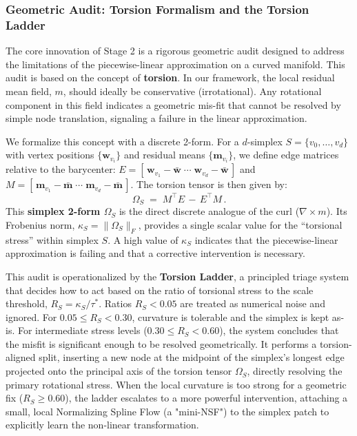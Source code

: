 \documentclass[11pt]{article}
\begin{document}
\subsubsection{Geometric Audit: Torsion Formalism and the Torsion Ladder}
The core innovation of Stage 2 is a rigorous geometric audit designed to address the limitations of the piecewise-linear approximation on a curved manifold. This audit is based on the concept of \textbf{torsion}. In our framework, the local residual mean field, $m$, should ideally be conservative (irrotational). Any rotational component in this field indicates a geometric mis-fit that cannot be resolved by simple node translation, signaling a failure in the linear approximation.

We formalize this concept with a discrete 2-form. For a $d$-simplex $S=\{v_0,\dots,v_d\}$ with vertex positions $\{\mathbf w_{v_i}\}$ and residual means $\{\mathbf m_{v_i}\}$, we define edge matrices relative to the barycenter: $E=[\,\mathbf w_{v_1}{-}\bar{\mathbf w}\;\cdots\;\mathbf w_{v_d}{-}\bar{\mathbf w}\,]$ and $M=[\,\mathbf m_{v_1}{-}\bar{\mathbf m}\;\cdots\;\mathbf m_{v_d}{-}\bar{\mathbf m}\,]$. The torsion tensor is then given by:
\[
\Omega_S \;=\; M^{\top}E \,{-}\, E^{\top}M\,.
\]
This \textbf{simplex 2-form $\Omega_S$} is the direct discrete analogue of the curl ($\nabla \times m$). Its Frobenius norm, $\kappa_S = \lVert \Omega_S \rVert_F$, provides a single scalar value for the ``torsional stress'' within simplex $S$. A high value of $\kappa_S$ indicates that the piecewise-linear approximation is failing and that a corrective intervention is necessary.

This audit is operationalized by the \textbf{Torsion Ladder}, a principled triage system that decides how to act based on the ratio of torsional stress to the scale threshold, $R_S = \kappa_S / \tau^*$. Ratios $R_S < 0.05$ are treated as numerical noise and ignored. For $0.05 \le R_S < 0.30$, curvature is tolerable and the simplex is kept as-is. For intermediate stress levels ($0.30 \le R_S < 0.60$), the system concludes that the misfit is significant enough to be resolved geometrically. It performs a torsion-aligned split, inserting a new node at the midpoint of the simplex's longest edge projected onto the principal axis of the torsion tensor $\Omega_S$, directly resolving the primary rotational stress. When the local curvature is too strong for a geometric fix ($R_S \ge 0.60$), the ladder escalates to a more powerful intervention, attaching a small, local Normalizing Spline Flow (a "mini-NSF") to the simplex patch to explicitly learn the non-linear transformation.
\end{document}
